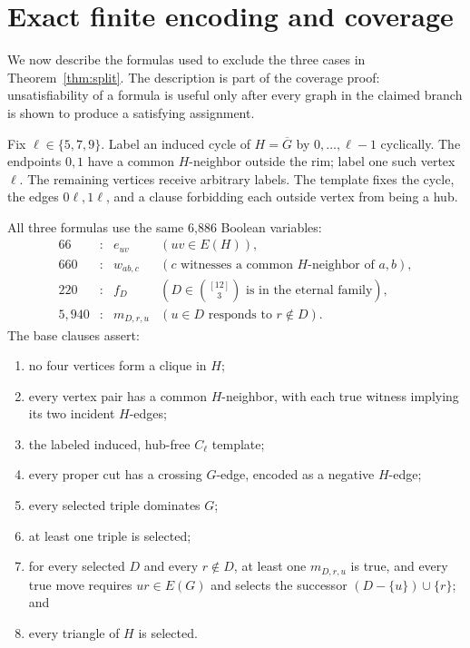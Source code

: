 \documentclass[11pt]{article}
\theoremstyle{definition}
\theoremstyle{remark}
\begin{document}
\section{Exact finite encoding and coverage}\label{sec:encoding}

We now describe the formulas used to exclude the three cases in
Theorem~\ref{thm:split}.  The description is part of the coverage proof:
unsatisfiability of a formula is useful only after every graph in the
claimed branch is shown to produce a satisfying assignment.

Fix \(\ell\in\{5,7,9\}\).  Label an induced cycle of \(H=\overline G\) by
\(0,\ldots,\ell-1\) cyclically.  The endpoints \(0,1\) have a common
\(H\)-neighbor outside the rim; label one such vertex \(\ell\).  The
remaining vertices receive arbitrary labels.  The template fixes the cycle,
the edges \(0\ell,1\ell\), and a clause forbidding each outside vertex from
being a hub.

All three formulas use the same 6,886 Boolean variables:
\[
\begin{array}{rcll}
66   &:& e_{uv} & (uv\in E(H)),\\
660  &:& w_{ab,c} & (c\text{ witnesses a common }H\text{-neighbor of }a,b),\\
220  &:& f_D & (D\in\binom{[12]}3\text{ is in the eternal family}),\\
5,940&:& m_{D,r,u} & (u\in D\text{ responds to }r\notin D).
\end{array}
\tag{4.1}
\]
The base clauses assert:

\begin{enumerate}
\item no four vertices form a clique in \(H\);
\item every vertex pair has a common \(H\)-neighbor, with each true witness
      implying its two incident \(H\)-edges;
\item the labeled induced, hub-free \(C_\ell\) template;
\item every proper cut has a crossing \(G\)-edge, encoded as a negative
      \(H\)-edge;
\item every selected triple dominates \(G\);
\item at least one triple is selected;
\item for every selected \(D\) and every \(r\notin D\), at least one
      \(m_{D,r,u}\) is true, and every true move requires
      \(ur\in E(G)\) and selects the successor
      \((D-\{u\})\cup\{r\}\); and
\item every triangle of \(H\) is selected.
\end{enumerate}
\end{document}
